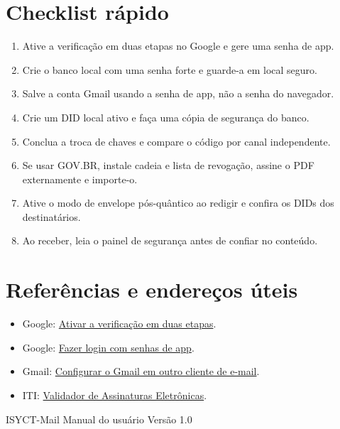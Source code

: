 \documentclass[11pt,a4paper]{article}
\begin{document}
\section{Checklist rápido}

\begin{tcolorbox}[colback=isyctNavy,colframe=isyctNavy,arc=3mm,left=6mm,right=6mm,top=5mm,bottom=5mm]
\color{white}
\begin{enumerate}[label=\textcolor{isyctCyan}{\arabic*.},leftmargin=7mm]
  \item Ative a verificação em duas etapas no Google e gere uma senha de app.
  \item Crie o banco local com uma senha forte e guarde-a em local seguro.
  \item Salve a conta Gmail usando a senha de app, não a senha do navegador.
  \item Crie um DID local ativo e faça uma cópia de segurança do banco.
  \item Conclua a troca de chaves e compare o código por canal independente.
  \item Se usar GOV.BR, instale cadeia e lista de revogação, assine o PDF externamente e importe-o.
  \item Ative o modo de envelope pós-quântico ao redigir e confira os DIDs dos destinatários.
  \item Ao receber, leia o painel de segurança antes de confiar no conteúdo.
\end{enumerate}
\end{tcolorbox}

\section*{Referências e endereços úteis}

\begin{itemize}
  \item Google: \href{https://support.google.com/accounts/answer/185839?hl=pt-BR}{Ativar a verificação em duas etapas}.
  \item Google: \href{https://support.google.com/accounts/answer/185833?hl=pt-BR}{Fazer login com senhas de app}.
  \item Gmail: \href{https://support.google.com/mail/answer/7126229?hl=pt-BR}{Configurar o Gmail em outro cliente de e-mail}.
  \item ITI: \href{https://validar.iti.gov.br/}{Validador de Assinaturas Eletrônicas}.
\end{itemize}

\vfill
\begin{center}
  \color{isyctMuted}\small
  ISYCT-Mail \textbullet{} Manual do usuário \textbullet{} Versão 1.0
\end{center}
\end{document}
